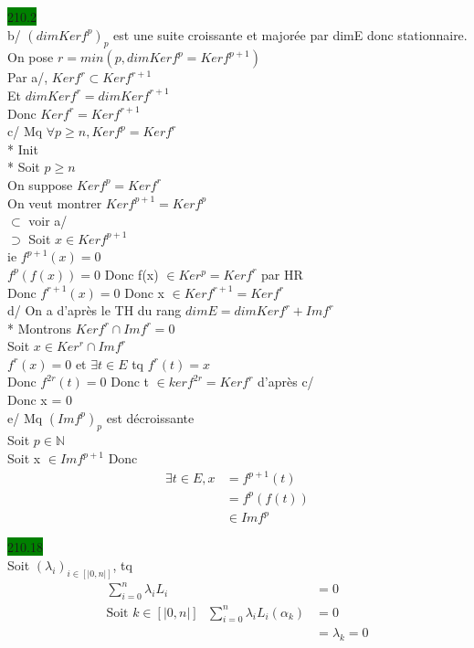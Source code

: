 \documentclass{article}
\begin{document}
\noindent
\colorbox{green}{210.2}\\
b/ \((dim Ker f^p)_p\) est une suite croissante et majorée par dimE donc 
stationnaire.\\
On pose \(r = min({p, dim Kerf^p = Kerf^{p+1}})\)\\
Par a/, \(Kerf^r \subset Kerf^{r+1}\)\\
Et \(dim Kerf^r = dim Ker f^{r+1}\)\\
Donc \(Ker f^r = Ker f^{r+1}\)\\
c/ Mq \(\forall p \geq n, Kerf^p = Kerf^r\)\\
* Init\\
* Soit \(p\geq n\)\\
On suppose \(Kerf^p = Kerf^r\)\\
On veut montrer \(Kerf^{p+1} = Kerf^p\)\\
\(\subset\) voir a/\\
\(\supset\) Soit \(x \in Kerf^{p+1}\)\\
ie \(f^{p+1}(x) = 0\)\\
\(f^p(f(x)) = 0\)
Donc f(x) \(\in Ker^p = Kerf^r\) par HR\\
Donc \(f^{r+1}(x) = 0\)
Donc x \(\in Kerf^{r+1} = Kerf^r\)\\
d/ On a d'après le TH du rang \(dimE = dimKerf^r + Imf^r\)\\
* Montrons \(Kerf^r \cap Imf^r = {0}\)\\
Soit \(x \in Ker^r \cap Imf^r\)\\
\(f^r(x)=0\) et \(\exists t \in E\) tq \(f^r(t) = x\)\\
Donc \(f^{2r}(t) = 0\)
Donc t \(\in kerf^{2r} = Kerf^r\) d'après c/\\
Donc x = 0\\
e/ Mq \((Imf^p)_p\) est décroissante\\
Soit \(p \in \mathbb{N}\)\\
Soit x \(\in Imf^{p+1}\)
Donc \begin{align*}
    \exists t \in E, x &= f^{p+1}(t)\\
    &= f^p(f(t))\\
    &\in Imf^p
\end{align*}

\noindent \colorbox{green}{210.18}\\
Soit \((\lambda_i)_{i \in [|0,n|]}\), tq \begin{align*}
    \sum_{i=0}^{n}\lambda_i L_i &= 0\\
    \text{Soit \(k \in [|0,n|]\) } \sum_{i=0}^{n}\lambda_i L_i(\alpha_k) &= 0\\
    &= \lambda_k = 0
\end{align*}
\end{document}
